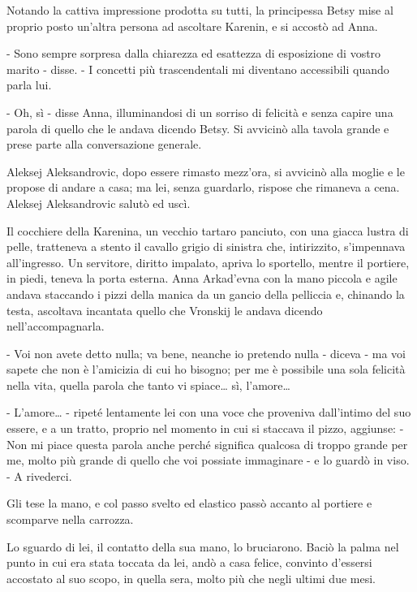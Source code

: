 Notando la cattiva impressione prodotta su tutti, la principessa Betsy mise al proprio posto un'altra persona ad ascoltare Karenin, e si accostò ad Anna. 

- Sono sempre sorpresa dalla chiarezza ed esattezza di esposizione di vostro marito - disse. - I concetti più trascendentali mi diventano accessibili quando parla lui. 

- Oh, sì - disse Anna, illuminandosi di un sorriso di felicità e senza capire una parola di quello che le andava dicendo Betsy. Si avvicinò alla tavola grande e prese parte alla conversazione generale. 

Aleksej Aleksandrovic, dopo essere rimasto mezz'ora, si avvicinò alla moglie e le propose di andare a casa; ma lei, senza guardarlo, rispose che rimaneva a cena. Aleksej Aleksandrovic salutò ed uscì. 

Il cocchiere della Karenina, un vecchio tartaro panciuto, con una giacca lustra di pelle, tratteneva a stento il cavallo grigio di sinistra che, intirizzito, s'impennava all'ingresso. Un servitore, diritto impalato, apriva lo sportello, mentre il portiere, in piedi, teneva la porta esterna. Anna Arkad'evna con la mano piccola e agile andava staccando i pizzi della manica da un gancio della pelliccia e, chinando la testa, ascoltava incantata quello che Vronskij le andava dicendo nell'accompagnarla. 

- Voi non avete detto nulla; va bene, neanche io pretendo nulla - diceva - ma voi sapete che non è l'amicizia di cui ho bisogno; per me è possibile una sola felicità nella vita, quella parola che tanto vi spiace\ldots{} sì, l'amore\ldots{} 

- L'amore\ldots{} - ripeté lentamente lei con una voce che proveniva dall'intimo del suo essere, e a un tratto, proprio nel momento in cui si staccava il pizzo, aggiunse: - Non mi piace questa parola anche perché significa qualcosa di troppo grande per me, molto più grande di quello che voi possiate immaginare - e lo guardò in viso. - A rivederci. 

Gli tese la mano, e col passo svelto ed elastico passò accanto al portiere e scomparve nella carrozza. 

Lo sguardo di lei, il contatto della sua mano, lo bruciarono. Baciò la palma nel punto in cui era stata toccata da lei, andò a casa felice, convinto d'essersi accostato al suo scopo, in quella sera, molto più che negli ultimi due mesi. 

\label{viii-1} 

